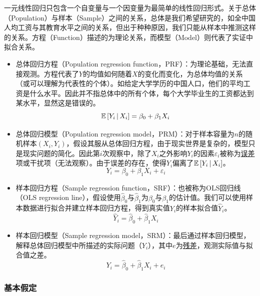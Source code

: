 \documentclass[11pt]{article}
\begin{document}
一元线性回归只包含一个自变量与一个因变量为最简单的线性回归形式。关于总体（Population）与样本（Sample）之间的关系，总体是我们希望研究的，如全中国人均工资与其教育水平之间的关系，但出于种种原因，我们只能从样本中推测这样的关系。方程（Function）描述的为理论关系，而模型（Model）则代表了实证中拟合关系。
\begin{itemize}
    \item 总体回归方程（Population regression function，PRF）：为理论基础，无法直接观测。方程代表了$Y$的均值如何随着$X$的变化而变化，为总体均值的关系（或可以理解为代表性的个体）。如给定大学学历的中国人口，他们的平均工资是什么水平。因此并不指总体中的所有个体，每个大学毕业生的工资都达到某水平，显然这是错误的。
    \begin{equation*}
        \mathbb{E}\left[ Y_i \,\vert\, X_i \right] = \beta_0 + \beta_1 X_i
    \end{equation*}
    \item 总体回归模型（Population regression model，PRM）：对于样本容量为$n$的随机样本$(X_i,Y_i)$，假设其服从总体回归方程，由于现实世界是复杂的，模型只是现实问题的简化。因此第$i$次观察中，除了$X_i$之外影响$Y_i$的因素$\varepsilon_i$被称为\uline{误差}项或干扰项（无法观察）。由于误差的存在，使得$Y_i$偏离了$\mathbb{E}\left[ Y_i \,\vert\, X_i \right]$。
    \begin{equation*}
        Y_i = \beta_0 + \beta_1 X_i + \varepsilon_i
    \end{equation*}
    \item 样本回归方程（Sample regression function，SRF）：也被称为OLS回归线（OLS regression line），假设使用$\hat{\beta}_0$与$\hat{\beta}_1$为$\beta_0$与$\beta_1$的估计值。我们可以使用样本数据进行拟合并建立样本回归方程，得到真实值$Y_i$的样本拟合值$\hat{Y}_i$。
    \begin{equation*}
        \hat{Y}_i = \hat{\beta}_0 + \hat{\beta}_1 X_i
    \end{equation*}
    \item 样本回归模型（Sample regression model，SRM）：最后通过样本回归模型，解释总体回归模型中所描述的实际问题（$Y_i$），其中$e$为\uline{残差}，观测实际值与拟合值之差。
    \begin{equation*}
        Y_i = \hat{\beta}_0 + \hat{\beta}_1 X_i + e_i
    \end{equation*}
\end{itemize}

\subsubsection{基本假定}
\end{document}
